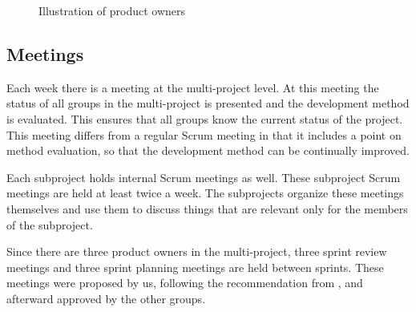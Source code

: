 \begin{figure}%
\centering
{}
\caption{Illustration of product owners}%
\label{fig:po_illu}%
\end{figure}

\subsection{Meetings}\label{sec:meetings}
Each week there is a meeting at the multi-project level. At this meeting the status of all groups in the multi-project is presented and the development method is evaluated. This ensures that all groups know the current status of the project. This meeting differs from a regular Scrum meeting in that it includes a point on method evaluation, so that the development method can be continually improved.

Each subproject holds internal Scrum meetings as well. These subproject Scrum meetings are held at least twice a week. The subprojects organize these meetings themselves and use them to discuss things that are relevant only for the members of the subproject.

Since there are three product owners in the multi-project, three sprint review meetings and three sprint planning meetings are held between sprints. These meetings were proposed by us, following the recommendation from \textcite{bird_davies_2007}, and afterward approved by the other groups.

